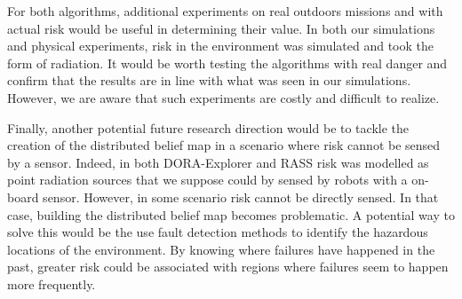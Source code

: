 For both algorithms, additional experiments on real outdoors missions and with actual risk would be useful in determining their value. In both our simulations and physical experiments, risk in the environment was simulated and took the form of radiation. It would be worth testing the algorithms with real danger and confirm that the results are in line with what was seen in our simulations. However, we are aware that such experiments are costly and difficult to realize.

Finally, another potential future research direction would be to tackle the creation of the distributed belief map in a scenario where risk cannot be sensed by a sensor. Indeed, in both DORA-Explorer and RASS risk was modelled as point radiation sources that we suppose could by sensed by robots with a on-board sensor. However, in some scenario risk cannot be directly sensed. In that case, building the distributed belief map becomes problematic. A potential way to solve this would be the use fault detection methods to identify the hazardous locations of the environment. By knowing where failures have happened in the past, greater risk could be associated with regions where failures seem to happen more frequently. 

